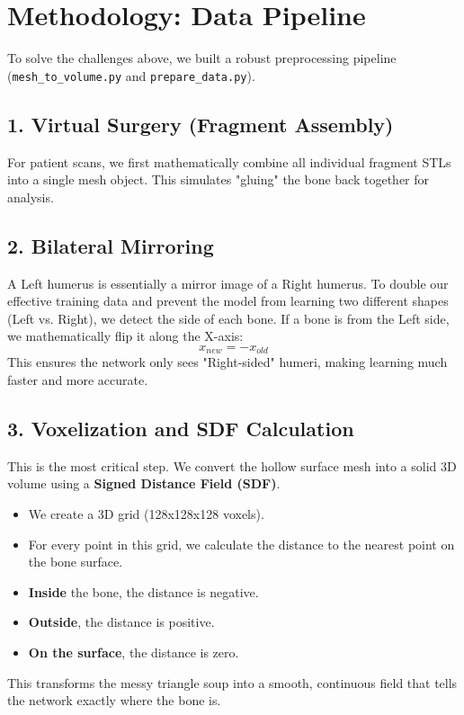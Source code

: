 \documentclass[12pt]{article}
\begin{document}
\section{Methodology: Data Pipeline}

To solve the challenges above, we built a robust preprocessing pipeline (\texttt{mesh\_to\_volume.py} and \texttt{prepare\_data.py}).

\subsection{1. Virtual Surgery (Fragment Assembly)}
For patient scans, we first mathematically combine all individual fragment STLs into a single mesh object. This simulates "gluing" the bone back together for analysis.

\subsection{2. Bilateral Mirroring}
A Left humerus is essentially a mirror image of a Right humerus. To double our effective training data and prevent the model from learning two different shapes (Left vs. Right), we detect the side of each bone. If a bone is from the Left side, we mathematically flip it along the X-axis:
\begin{equation}
    x_{new} = -x_{old}
\end{equation}
This ensures the network only sees "Right-sided" humeri, making learning much faster and more accurate.

\subsection{3. Voxelization and SDF Calculation}
This is the most critical step. We convert the hollow surface mesh into a solid 3D volume using a \textbf{Signed Distance Field (SDF)}.
\begin{itemize}
    \item We create a 3D grid (128x128x128 voxels).
    \item For every point in this grid, we calculate the distance to the nearest point on the bone surface.
    \item \textbf{Inside} the bone, the distance is negative.
    \item \textbf{Outside}, the distance is positive.
    \item \textbf{On the surface}, the distance is zero.
\end{itemize}
This transforms the messy triangle soup into a smooth, continuous field that tells the network exactly where the bone is.
\end{document}
